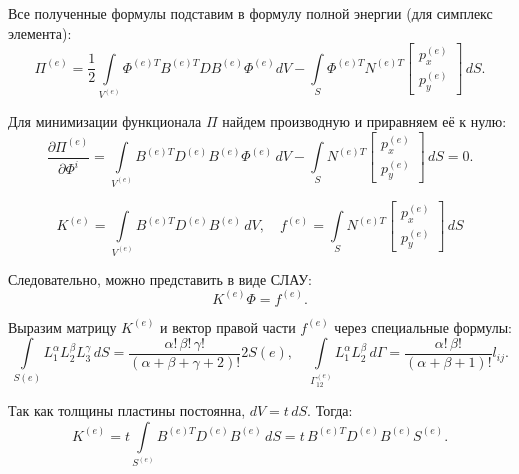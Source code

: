 \documentclass[a4paper, 12pt]{article}
\begin{document}
Все полученные формулы подставим в формулу полной энергии (для симплекс элемента):
\[
\Pi^{(e)} = \frac{1}{2} \int\limits_{V^{(e)}} \Phi^{(e)T} B^{(e)T} D B^{(e)} \Phi^{(e)} dV - \int\limits_S \Phi^{(e)T} N^{(e)T} \begin{bmatrix} p_x^{(e)} \\ p_y^{(e)} \end{bmatrix} \, dS.
\]

Для минимизации функционала \(\Pi\) найдем производную и приравняем её к нулю:
\[
\frac{\partial \Pi^{(e)}}{\partial \Phi^{i}} = \int\limits_{V^{(e)}} B^{(e)T} D^{(e)} B^{(e)} \Phi^{(e)} \, dV - \int\limits_S N^{(e)T} \begin{bmatrix} p_x^{(e)} \\ p_y^{(e)} \end{bmatrix} \, dS = 0.
\]


\[
K^{(e)} = \int\limits_{V^{(e)}} B^{(e)T} D^{(e)} B^{(e)} \, dV, \quad f^{(e)} = \int\limits_{S} N^{(e)T} \begin{bmatrix} p_x^{(e)} \\ p_y^{(e)} \end{bmatrix} \, dS
\]

Следовательно, можно представить в виде СЛАУ:
\[
K^{(e)} \Phi = f^{(e)}.
\]

Выразим матрицу \(K^{(e)}\) и вектор правой части \(f^{(e)}\) через специальные формулы:
\[
\int\limits_{S(e)} L_1^{\alpha} L_2^{\beta} L_3^{\gamma} \, dS = \frac{\alpha! \, \beta! \, \gamma!}{(\alpha + \beta + \gamma + 2)!} 2S(e), \quad
\int\limits_{\Gamma_{12}^{(e)}} L_1^{\alpha} L_2^{\beta} \, d\Gamma = \frac{\alpha! \, \beta!}{(\alpha + \beta + 1)!} l_{ij}.
\]

Так как толщины пластины постоянна,  \(dV = t \, dS\). Тогда:
\[
K^{(e)} = t \int\limits_{S^{(e)}} B^{(e)T} D^{(e)} B^{(e)} \, dS =t \, B^{(e)T} D^{(e)} B^{(e)} S^{(e)}.
\]
\end{document}
